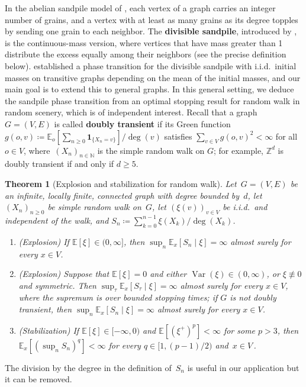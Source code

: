\documentclass[11pt]{amsart}
\theoremstyle{plain}
\newtheorem{theorem}{Theorem}[section]
\theoremstyle{definition}
\newcommand{\Z}{\mathbb{Z}}
\newcommand{\N}{\mathbb{N}}
\newcommand{\E}{\mathbb{E}}
\newcommand{\one}{\mathbf{1}}
\DeclareMathOperator{\var}{Var}
\begin{document}
	In the abelian sandpile model of \citet*{BTW}, each vertex of a graph carries an integer number of grains, and a vertex with at least as many grains as its degree topples by sending one grain to each neighbor. The \textbf{divisible sandpile}, introduced by \citet{LP09, LP10}, is the continuous-mass version, where vertices that have mass greater than 1 distribute the excess equally among their neighbors (see the precise definition below). \citet*{div-sand-crit} established a phase transition for  the divisible sandpile with i.i.d.\ initial masses on transitive graphs depending on the mean of the initial masses, and our main goal is to extend this to general graphs. 
	In this general setting, we deduce the sandpile phase transition from an optimal stopping result for random walk in random scenery, which is of independent interest. Recall that a graph~$G = (V,E)$ is called \textbf{doubly transient} if its Green function $g(o,v) \coloneqq \E_o[\sum_{n \geq 0} \one_{\{X_n = v\}}] / \deg(v)$ satisfies $\sum_{v \in V}  g(o,v)^2 < \infty$ for all~$o \in V$, where~$(X_n)_{n\in\N}$ is the simple random walk on $G$; for example, $\Z^d$ is doubly transient if and only if $d \geq 5$.
	\begin{theorem}[Explosion and stabilization for random walk]\label{thm:OS}
		Let~$G=(V,E)$ be an infinite, locally finite, connected graph with degree bounded by~$d$, let~$(X_n)_{n\geq 0}$ be simple random walk on~$G$, let $(\xi(v))_{v\in V}$ be i.i.d.\ and independent of the walk, and $S_n\coloneqq\sum_{k=0}^{n-1}\xi(X_k)/\deg(X_k)$.
		\begin{enumerate}[label=\textup{(\roman*)}]
			\item \textup{(Explosion)}\; If $\E[\xi]\in(0,\infty]$, then $\sup_n\E_x[S_n\mid\xi]=\infty$ almost surely for every $x\in V$.
			\item \textup{(Explosion)}\; Suppose that $\E[\xi]=0$ and either $\var(\xi)\in(0,\infty)$, or $\xi\not\equiv 0$ and symmetric.   Then $\sup_{\tau} \E_x[S_\tau \mid\xi]=\infty$ almost surely for every $x\in V$, where the supremum is over bounded stopping times; if $G$ is not doubly transient, then $\sup_n\E_x[S_n\mid\xi]=\infty$ almost surely for every $x\in V$.
			\item \textup{(Stabilization)}\; If $\E[\xi]\in[-\infty,0)$ and $\E[(\xi^+)^p]<\infty$ for some $p>3$, then $\E_x[ (\sup_n S_n)^q]<\infty$ for every $q\in[1,(p-1)/2)$ and~$x \in V$\,.
		\end{enumerate}
	\end{theorem}
	The division by the degree in the definition of~$S_n$ is useful in our application but it can be removed.  
\end{document}

